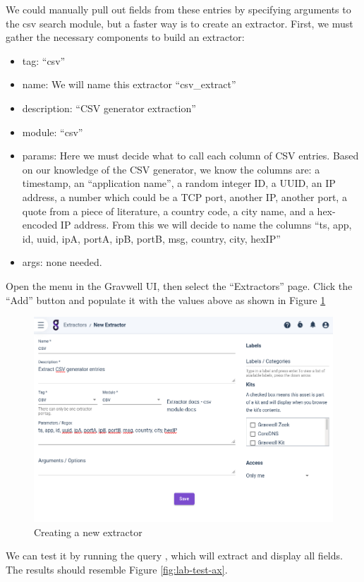We could manually pull out fields from these entries by specifying
arguments to the csv search module, but a faster way is to create an
extractor. First, we must gather the necessary components to build an
extractor:

\begin{itemize}
\tightlist
\item
  tag: ``csv''
\item
  name: We will name this extractor ``csv\_extract''
\item
  description: ``CSV generator extraction''
\item
  module: ``csv''
\item
  params: Here we must decide what to call each column of CSV entries.
  Based on our knowledge of the CSV generator, we know the columns are:
  a timestamp, an ``application name'', a random integer ID, a UUID,
  an IP address, a number which could be a TCP port, another IP, another
  port, a quote from a piece of literature, a country code, a city name,
  and a hex-encoded IP address. From this we will decide to name the
  columns ``ts, app, id, uuid, ipA, portA, ipB, portB, msg, country,
  city, hexIP''
\item
  args: none needed.
\end{itemize}

Open the menu in the Gravwell UI, then select the ``Extractors'' page.
Click the ``Add'' button and populate it with the values above as shown in Figure \ref{fig:lab-new-extractor}

\begin{figure}
	\includegraphics[width=0.8\linewidth]{images/new-extractor.png}
	\caption{Creating a new extractor}
	\label{fig:lab-new-extractor}
\end{figure}

We can test it by running the query , which will extract and display all fields. The results should resemble Figure \ref{fig:lab-test-ax}.

